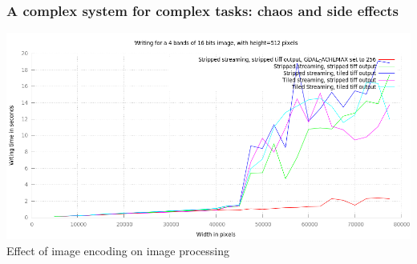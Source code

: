 \documentclass[8pt]{beamer}
\begin{document}
\begin{frame}
\frametitle{A complex system for complex tasks: chaos and side effects}
\begin{center}
\includegraphics[width=\textwidth]{images/Writing.png}\\
\tiny{Effect of image encoding on image processing}
\end{center}
\end{frame}
\end{document}
